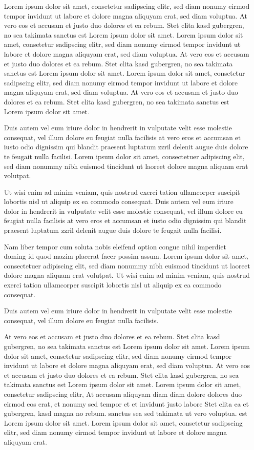 Lorem ipsum dolor sit amet, consetetur sadipscing elitr, sed diam nonumy eirmod tempor invidunt ut labore et dolore magna aliquyam erat, sed diam voluptua. At vero eos et accusam et justo duo dolores et ea rebum. Stet clita kasd gubergren, no sea takimata sanctus est Lorem ipsum dolor sit amet. Lorem ipsum dolor sit amet, consetetur sadipscing elitr, sed diam nonumy eirmod tempor invidunt ut labore et dolore magna aliquyam erat, sed diam voluptua. At vero eos et accusam et justo duo dolores et ea rebum. Stet clita kasd gubergren, no sea takimata sanctus est Lorem ipsum dolor sit amet. Lorem ipsum dolor sit amet, consetetur sadipscing elitr, sed diam nonumy eirmod tempor invidunt ut labore et dolore magna aliquyam erat, sed diam voluptua. At vero eos et accusam et justo duo dolores et ea rebum. Stet clita kasd gubergren, no sea takimata sanctus est Lorem ipsum dolor sit amet.  

Duis autem vel eum iriure dolor in hendrerit in vulputate velit esse molestie consequat, vel illum dolore eu feugiat nulla facilisis at vero eros et accumsan et iusto odio dignissim qui blandit praesent luptatum zzril delenit augue duis dolore te feugait nulla facilisi. Lorem ipsum dolor sit amet, consectetuer adipiscing elit, sed diam nonummy nibh euismod tincidunt ut laoreet dolore magna aliquam erat volutpat.  

Ut wisi enim ad minim veniam, quis nostrud exerci tation ullamcorper suscipit lobortis nisl ut aliquip ex ea commodo consequat. Duis autem vel eum iriure dolor in hendrerit in vulputate velit esse molestie consequat, vel illum dolore eu feugiat nulla facilisis at vero eros et accumsan et iusto odio dignissim qui blandit praesent luptatum zzril delenit augue duis dolore te feugait nulla facilisi.  

Nam liber tempor cum soluta nobis eleifend option congue nihil imperdiet doming id quod mazim placerat facer possim assum. Lorem ipsum dolor sit amet, consectetuer adipiscing elit, sed diam nonummy nibh euismod tincidunt ut laoreet dolore magna aliquam erat volutpat. Ut wisi enim ad minim veniam, quis nostrud exerci tation ullamcorper suscipit lobortis nisl ut aliquip ex ea commodo consequat.  

Duis autem vel eum iriure dolor in hendrerit in vulputate velit esse molestie consequat, vel illum dolore eu feugiat nulla facilisis.   

At vero eos et accusam et justo duo dolores et ea rebum. Stet clita kasd gubergren, no sea takimata sanctus est Lorem ipsum dolor sit amet. Lorem ipsum dolor sit amet, consetetur sadipscing elitr, sed diam nonumy eirmod tempor invidunt ut labore et dolore magna aliquyam erat, sed diam voluptua. At vero eos et accusam et justo duo dolores et ea rebum. Stet clita kasd gubergren, no sea takimata sanctus est Lorem ipsum dolor sit amet. Lorem ipsum dolor sit amet, consetetur sadipscing elitr, At accusam aliquyam diam diam dolore dolores duo eirmod eos erat, et nonumy sed tempor et et invidunt justo labore Stet clita ea et gubergren, kasd magna no rebum. sanctus sea sed takimata ut vero voluptua. est Lorem ipsum dolor sit amet. Lorem ipsum dolor sit amet, consetetur sadipscing elitr, sed diam nonumy eirmod tempor invidunt ut labore et dolore magna aliquyam erat.  

